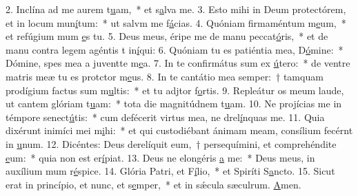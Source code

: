 2. Inclína ad me aurem t\uline{u}am,~* et s\uline{a}lva me.
3. Esto mihi in Deum protectórem, et in locum mun\uline{í}tum:~* ut salvm me f\uline{á}cias.
4. Quóniam firmaméntum m\uline{e}um,~* et refúgium mum \uline{e}s tu.
5. Deus meus, éripe me de manu peccat\uline{ó}ris,~* et de manu contra legem agéntis t in\uline{í}qui:
6. Quóniam tu es patiéntia mea, D\uline{ó}mine:~* Dómine, spes mea a juventte m\uline{e}a.
7. In te confirmátus sum ex \uline{ú}tero:~* de ventre matris meæ tu es protctor m\uline{e}us.
8. In te cantátio mea semper:~† tamquam prodígium factus sum m\uline{u}ltis:~* et tu adjtor f\uline{o}rtis.
9. Repleátur os meum laude, ut cantem glóriam t\uline{u}am:~* tota die magnitúdnem t\uline{u}am.
10. Ne projícias me in témpore senect\uline{ú}tis:~* cum defécerit virtus mea, ne drel\uline{í}nquas me.
11. Quia dixérunt inimíci mei m\uline{i}hi:~* et qui custodiébant ánimam meam, consílium fecérnt in \uline{u}num.
12. Dicéntes: Deus derelíquit eum,~† persequímini, et comprehéndite \uline{e}um:~* quia non est  er\uline{í}piat.
13. Deus ne elongéris \uline{a} me:~* Deus meus, in auxílium mum r\uline{é}spice.
14. Glória Patri, et F\uline{í}lio,~* et Spiríti S\uline{a}ncto.
15. Sicut erat in princípio, et nunc, et s\uline{e}mper,~* et in sǽcula sæculrum. \uline{A}men.
